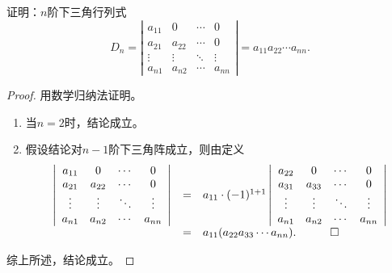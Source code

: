 \documentclass[10pt,a4paper%
tablecaptionabove]{article}
\begin{document}
\begin{CJK}{UTF8}{gkai}
  
  \begin{li}
    证明：$n$阶下三角行列式
    $$
    D_n = \left|
      \begin{array}{cccc}
        a_{11}  &  0 & \cdots & 0 \\
        a_{21}  &  a_{22} & \cdots & 0 \\
        \vdots & \vdots & \ddots & \vdots\\  
        a_{n1}  &  a_{n2} & \cdots & a_{nn} 
      \end{array}
    \right| = a_{11} a_{22} \cdots a_{nn}.
    $$  
  \end{li}
  \begin{proof}
    用数学归纳法证明。
    \begin{enumerate}
    \item 当$n=2$时，结论成立。 
    \item 假设结论对$n-1$阶下三角阵成立，则由定义
      $$
      \begin{array}{rcl}
        \left|
        \begin{array}{cccc}
          a_{11}  &  0 & \cdots & 0 \\
          a_{21}  &  a_{22} & \cdots & 0 \\
          \vdots & \vdots & \ddots & \vdots\\  
          a_{n1}  &  a_{n2} & \cdots & a_{nn} 
        \end{array}
                                       \right| &=&  a_{11} \cdot (-1)^{1+1} \left|
                                                   \begin{array}{cccc}
                                                     a_{22}  &  0 & \cdots & 0 \\
                                                     a_{31}  &  a_{33} & \cdots & 0 \\
                                                     \vdots & \vdots & \ddots & \vdots\\  
                                                     a_{n1}  &  a_{n2} & \cdots & a_{nn} 
                                                   \end{array}
                                                                                  \right| \\[0.1in]
                  &=&  a_{11} (a_{22} a_{33} \cdots a_{nn}). \quad \qed        
      \end{array}
      $$    
    \end{enumerate}
    综上所述，结论成立。
  \end{proof}


\end{CJK}
\end{document}
